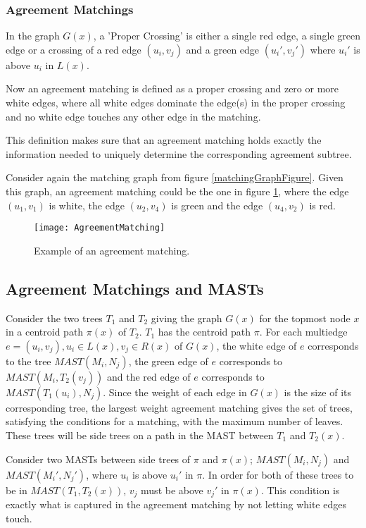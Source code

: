\subsubsection{Agreement Matchings}
In the graph $G(x)$, a 'Proper Crossing' is either a single red edge, a single green edge or a crossing of a red edge $(u_i,v_j)$ and a green edge $(u_i',v_j')$ where $u_i'$ is above $u_i$ in $L(x)$.

Now an agreement matching is defined as a proper crossing and zero or more white edges, where all white edges dominate the edge(s) in the proper crossing and no white edge touches any other edge in the matching.

This definition makes sure that an agreement matching holds exactly the information needed to uniquely determine the corresponding agreement subtree.

Consider again the matching graph from figure \ref{matchingGraphFigure}. Given this graph, an agreement matching could be the one in figure \ref{agreementMatchingFigure}, where the edge $(u_1,v_1)$ is white, the edge $(u_2,v_4)$ is green and the edge $(u_4,v_2)$ is red.

\begin{figure}
	\texttt{[image: AgreementMatching]}
	\caption{Example of an agreement matching.}
	\label{agreementMatchingFigure}
\end{figure}

\subsection{Agreement Matchings and MASTs}
Consider the two trees $T_1$ and $T_2$ giving the graph $G(x)$ for the topmost node $x$ in a centroid path $\pi(x)$ of $T_2$. $T_1$ has the centroid path $\pi$. For each multiedge $e = (u_i, v_j), u_i \in L(x), v_j \in R(x)$ of $G(x)$, the white edge of $e$ corresponds to the tree $MAST(M_i, N_j)$, the green edge of $e$ corresponds to $MAST(M_i, T_2(v_j))$ and the red edge of $e$ corresponds to $MAST(T_1(u_i), N_j)$. Since the weight of each edge in $G(x)$ is the size of its corresponding tree, the largest weight agreement matching gives the set of trees, satisfying the conditions for a matching, with the maximum number of leaves. These trees will be side trees on a path in the MAST between $T_1$ and $T_2(x)$.

Consider two MASTs between side trees of $\pi$ and $\pi(x)$; $MAST(M_i, N_j)$ and $MAST(M_i', N_j')$, where $u_i$ is above $u_i'$ in $\pi$. In order for both of these trees to be in $MAST(T_1, T_2(x))$, $v_j$ must be above $v_j'$ in $\pi(x)$. This condition is exactly what is captured in the agreement matching by not letting white edges touch.

